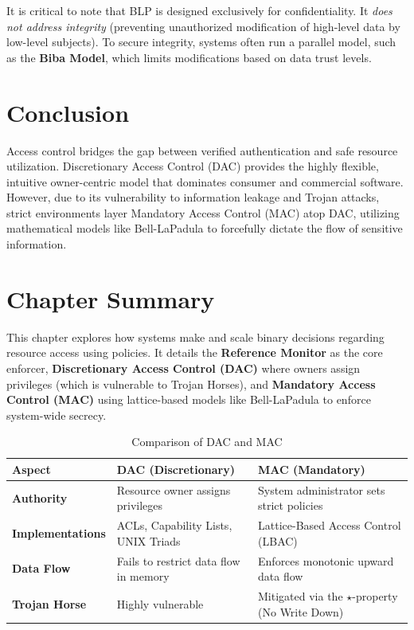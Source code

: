 It is critical to note that BLP is designed exclusively for confidentiality. It \textit{does not address integrity} (preventing unauthorized modification of high-level data by low-level subjects). To secure integrity, systems often run a parallel model, such as the \textbf{Biba Model}, which limits modifications based on data trust levels.

\section{Conclusion}
Access control bridges the gap between verified authentication and safe resource utilization. Discretionary Access Control (DAC) provides the highly flexible, intuitive owner-centric model that dominates consumer and commercial software. However, due to its vulnerability to information leakage and Trojan attacks, strict environments layer Mandatory Access Control (MAC) atop DAC, utilizing mathematical models like Bell-LaPadula to forcefully dictate the flow of sensitive information.

\section*{Chapter Summary}
This chapter explores how systems make and scale binary decisions regarding resource access using policies. It details the \textbf{Reference Monitor} as the core enforcer, \textbf{Discretionary Access Control (DAC)} where owners assign privileges (which is vulnerable to Trojan Horses), and \textbf{Mandatory Access Control (MAC)} using lattice-based models like Bell-LaPadula to enforce system-wide secrecy.

\begin{table}[htpb]
    \centering
    \begin{tabular}{|l|p{5.5cm}|p{5.5cm}|}
        \hline
        \textbf{Aspect} & \textbf{DAC (Discretionary)} & \textbf{MAC (Mandatory)} \\
        \hline
        \textbf{Authority} & Resource owner assigns privileges & System administrator sets strict policies \\
        \textbf{Implementations} & ACLs, Capability Lists, UNIX Triads & Lattice-Based Access Control (LBAC) \\
        \textbf{Data Flow} & Fails to restrict data flow in memory & Enforces monotonic upward data flow \\
        \textbf{Trojan Horse} & Highly vulnerable & Mitigated via the $\star$-property (No Write Down) \\
        \hline
    \end{tabular}
    \caption{Comparison of DAC and MAC}
    \label{tab:dac_vs_mac}
\end{table}

